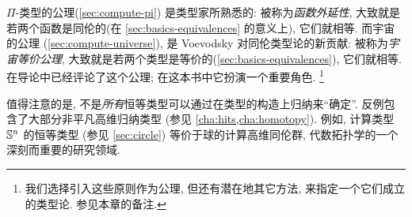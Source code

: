 %
%
$\Pi$-类型的公理(\cref{sec:compute-pi}) 是类型家所熟悉的: 被称为\emph{函数外延性}, 大致就是若两个函数是同伦的(在 \cref{sec:basics-equivalences} 的意义上), 它们就相等.
而宇宙的公理 (\cref{sec:compute-universe}), 是 Voevodsky 对同伦类型论的新贡献: 被称为\emph{宇宙等价公理}, 大致就是若两个类型是等价的(\cref{sec:basics-equivalences}), 它们就相等.
在导论中已经评论了这个公理; 在这本书中它扮演一个重要角色.%
\footnote{我们选择引入这些原则作为公理, 但还有潜在地其它方法, 来指定一个它们成立的类型论.
  参见本章的备注.}

值得注意的是, 不是\emph{所有}恒等类型可以通过在类型的构造上归纳来``确定''.
反例包含了大部分非平凡高维归纳类型 (参见 \cref{cha:hits,cha:homotopy}).
例如, 计算类型 $\mathbb{S}^n$ 的恒等类型 (参见 \cref{sec:circle}) 等价于球的计算高维同伦群, 代数拓扑学的一个深刻而重要的研究领域.